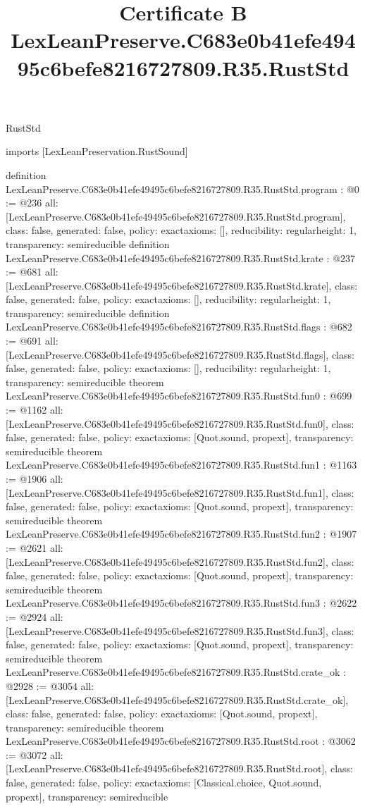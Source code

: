 \begin{lexlean}{RustStd}
\title{Certificate B LexLeanPreserve.C683e0b41efe49495c6befe8216727809.R35.RustStd}
\begin{coremodule}
imports [LexLeanPreservation.RustSound]

definition LexLeanPreserve.C683e0b41efe49495c6befe8216727809.R35.RustStd.program : @0 := @236 {
  all: [LexLeanPreserve.C683e0b41efe49495c6befe8216727809.R35.RustStd.program],
  class: false,
  generated: false,
  policy: exact{axioms: []},
  reducibility: regular{height: 1},
  transparency: semireducible
}
definition LexLeanPreserve.C683e0b41efe49495c6befe8216727809.R35.RustStd.krate : @237 := @681 {
  all: [LexLeanPreserve.C683e0b41efe49495c6befe8216727809.R35.RustStd.krate],
  class: false,
  generated: false,
  policy: exact{axioms: []},
  reducibility: regular{height: 1},
  transparency: semireducible
}
definition LexLeanPreserve.C683e0b41efe49495c6befe8216727809.R35.RustStd.flags : @682 := @691 {
  all: [LexLeanPreserve.C683e0b41efe49495c6befe8216727809.R35.RustStd.flags],
  class: false,
  generated: false,
  policy: exact{axioms: []},
  reducibility: regular{height: 1},
  transparency: semireducible
}
theorem LexLeanPreserve.C683e0b41efe49495c6befe8216727809.R35.RustStd.fun0 : @699 := @1162 {
  all: [LexLeanPreserve.C683e0b41efe49495c6befe8216727809.R35.RustStd.fun0],
  class: false,
  generated: false,
  policy: exact{axioms: [Quot.sound, propext]},
  transparency: semireducible
}
theorem LexLeanPreserve.C683e0b41efe49495c6befe8216727809.R35.RustStd.fun1 : @1163 := @1906 {
  all: [LexLeanPreserve.C683e0b41efe49495c6befe8216727809.R35.RustStd.fun1],
  class: false,
  generated: false,
  policy: exact{axioms: [Quot.sound, propext]},
  transparency: semireducible
}
theorem LexLeanPreserve.C683e0b41efe49495c6befe8216727809.R35.RustStd.fun2 : @1907 := @2621 {
  all: [LexLeanPreserve.C683e0b41efe49495c6befe8216727809.R35.RustStd.fun2],
  class: false,
  generated: false,
  policy: exact{axioms: [Quot.sound, propext]},
  transparency: semireducible
}
theorem LexLeanPreserve.C683e0b41efe49495c6befe8216727809.R35.RustStd.fun3 : @2622 := @2924 {
  all: [LexLeanPreserve.C683e0b41efe49495c6befe8216727809.R35.RustStd.fun3],
  class: false,
  generated: false,
  policy: exact{axioms: [Quot.sound, propext]},
  transparency: semireducible
}
theorem LexLeanPreserve.C683e0b41efe49495c6befe8216727809.R35.RustStd.crate_ok : @2928 := @3054 {
  all: [LexLeanPreserve.C683e0b41efe49495c6befe8216727809.R35.RustStd.crate_ok],
  class: false,
  generated: false,
  policy: exact{axioms: [Quot.sound, propext]},
  transparency: semireducible
}
theorem LexLeanPreserve.C683e0b41efe49495c6befe8216727809.R35.RustStd.root : @3062 := @3072 {
  all: [LexLeanPreserve.C683e0b41efe49495c6befe8216727809.R35.RustStd.root],
  class: false,
  generated: false,
  policy: exact{axioms: [Classical.choice, Quot.sound, propext]},
  transparency: semireducible
}


\end{coremodule}
\end{lexlean}

